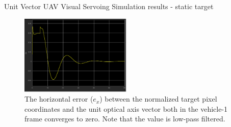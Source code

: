 \documentclass[9pt]{beamer}
\begin{document}
\begin{frame}{Unit Vector UAV Visual Servoing}
Simulation results - static target
\begin{figure}[htbp]
	\centering
	\includegraphics[height=1.5in]{chapter4/image_Ex_0mps}
		\caption{The horizontal error ($e_x$) between the normalized target pixel coordinates and the unit optical axis vector both in the vehicle-1 frame converges to zero. Note that the value is low-pass filtered.}
\end{figure}
\end{frame}
\end{document}
